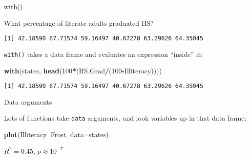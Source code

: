\documentclass[8pt,ignorenonframetext,]{beamer}
\newenvironment{Shaded}{\begin{snugshade}}{\end{snugshade}}
\newcommand{\KeywordTok}[1]{\textcolor[rgb]{0.13,0.29,0.53}{\textbf{#1}}}
\newcommand{\DataTypeTok}[1]{\textcolor[rgb]{0.13,0.29,0.53}{#1}}
\newcommand{\DecValTok}[1]{\textcolor[rgb]{0.00,0.00,0.81}{#1}}
\newcommand{\OperatorTok}[1]{\textcolor[rgb]{0.81,0.36,0.00}{\textbf{#1}}}
\newcommand{\NormalTok}[1]{#1}
\begin{document}
\begin{frame}[fragile]{with()}

What percentage of literate adults graduated HS?

\begin{Shaded}
\end{Shaded}

\begin{verbatim}
[1] 42.18590 67.71574 59.16497 40.67278 63.29626 64.35045
\end{verbatim}

\texttt{with()} takes a data frame and evaluates an expression
``inside'' it:

\begin{Shaded}
\begin{Highlighting}[]
\KeywordTok{with}\NormalTok{(states, }\KeywordTok{head}\NormalTok{(}\DecValTok{100}\OperatorTok{*}\NormalTok{(HS.Grad}\OperatorTok{/}\NormalTok{(}\DecValTok{100}\OperatorTok{-}\NormalTok{Illiteracy))))}
\end{Highlighting}
\end{Shaded}

\begin{verbatim}
[1] 42.18590 67.71574 59.16497 40.67278 63.29626 64.35045
\end{verbatim}

\end{frame}

\begin{frame}[fragile]{Data arguments}

Lots of functions take \texttt{data} arguments, and look variables up in
that data frame:

\begin{Shaded}
\begin{Highlighting}[]
\KeywordTok{plot}\NormalTok{(Illiteracy}\OperatorTok{~}\NormalTok{Frost, }\DataTypeTok{data=}\NormalTok{states)}
\end{Highlighting}
\end{Shaded}

\(R^2 =0.45\), \(p \approx {10}^{-7}\)

\end{frame}
\end{document}
